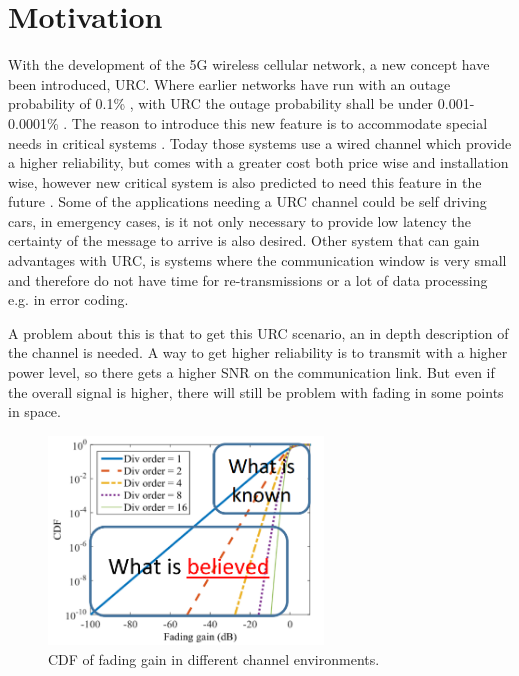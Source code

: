\section{Motivation}
With the development of the 5G wireless cellular network, a new concept have been introduced, \gls{URC}.  Where earlier networks have run with an outage probability of 0.1\% , with URC the outage probability shall be under 0.001-0.0001\% . The reason to introduce this new feature is to accommodate special needs in critical systems . Today those systems use a wired channel which provide a higher reliability, but comes with a greater cost both price wise and installation wise, however new critical system is also predicted to need this feature in the future . %
Some of the applications needing a URC channel could be self driving cars, in emergency cases, is it not only necessary to provide low latency the certainty of the message to arrive is also desired. %
Other system that can gain advantages with URC, is systems where the communication window is very small and therefore do not have time for re-transmissions or a lot of data processing e.g. in error coding.


A problem about this is that to get this URC scenario, an in depth description of the channel is needed. A way to get higher reliability is to transmit with a higher power level, so there gets a higher \gls{SNR} on the communication link. But even if the overall signal is higher, there will still be problem with fading in some points in space. 


\begin{figure}[H]
\centering
\includegraphics[width=0.65\textwidth]{figures/fading_gain.png}
\caption{\Gls{CDF} of fading gain in different channel environments.}
\label{fading_gain}
\end{figure}


